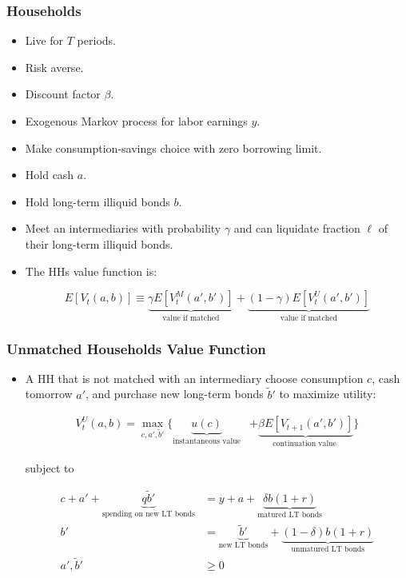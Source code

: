 \documentclass[handout]{beamer}
\begin{document}
\begin{frame}
\frametitle{Households}

\begin{itemize}[<+->]

\item Live for $T$ periods.
\item Risk averse.
\item Discount factor $\beta$.
\item Exogenous Markov process for labor earnings $y$.
\item Make consumption-savings choice with zero borrowing limit.
\item Hold cash $a$.
\item Hold long-term illiquid bonds $b$.
\item Meet an intermediaries with probability $\gamma$ and can liquidate fraction $\ell$ of their long-term illiquid bonds.
\item The HHs value function is:

$$
E[V_t(a, b)] \equiv \underbrace{\gamma E[V^M_{t}(a', b')]}_{\text{value if matched}} + \underbrace{(1-\gamma) E[V^U_{t}(a', b')]}_{\text{value if matched}}
$$

\end{itemize}

\end{frame}






\begin{frame}
\frametitle{Unmatched Households Value Function}

\begin{itemize}[<+->]

\item A HH that is not matched with an intermediary choose consumption $c$, cash tomorrow $a'$, and purchase new long-term bonds $\tilde{b}'$ to maximize utility:

\begin{align*}
V_{t}^U(a, b) 
= \max_{c, a', \tilde{b}'} 
\Bigg\{ 
\underbrace{u(c)}_{\text{instantaneous value}} 
&+ \underbrace{\beta E[V_{t+1}(a', b')]}_{\text{continuation value }} \Bigg\}
\end{align*}

subject to

\begin{align*}
c + a' + \underbrace{q\tilde{b}'}_{\text{spending on new LT bonds}} &= y + a + \underbrace{\delta b (1 + r)}_{\text{matured LT bonds}} \\ 
b' &= \underbrace{\tilde{b}'}_{\text{new LT bonds}} + \underbrace{(1-\delta)b(1+r)}_{\text{unmatured LT bonds}}\\
a', \tilde{b}' &\ge 0
\end{align*}

\end{itemize}

\end{frame}
\end{document}
